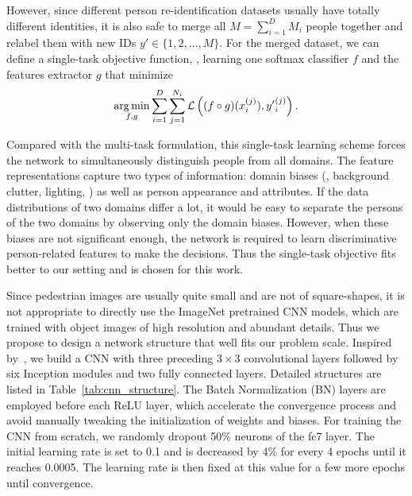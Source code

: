 However, since different person re-identification datasets usually have totally different identities, it is also safe to merge all $M=\sum_{i=1}^D M_i$ people together and relabel them with new IDs ${y'} \in \{1,2,\dots,M\}$. For the merged dataset, we can define a single-task objective function, \ie, learning one softmax classifier $f$ and the features extractor $g$ that minimize
\begin{equation} \label{eq:single-task-objfunc}
    \mathop{\mathrm{arg\,min}}_{f,g} \sum_{i=1}^D \sum_{j=1}^{N_i} \mathcal{L}\left( (f\circ g)(x_i^{(j)}), {y'}_i^{(j)} \right).
\end{equation}

Compared with the multi-task formulation, this single-task learning scheme forces the network to simultaneously distinguish people from all domains. The feature representations capture two types of information: domain biases (\eg, background clutter, lighting, \etc) as well as person appearance and attributes. If the data distributions of two domains differ a lot, it would be easy to separate the persons of the two domains by observing only the domain biases. However, when these biases are not significant enough, the network is required to learn discriminative person-related features to make the decisions. Thus the single-task objective fits better to our setting and is chosen for this work.

Since pedestrian images are usually quite small and are not of square-shapes, it is not appropriate to directly use the ImageNet pretrained CNN models, which are trained with object images of high resolution and abundant details. Thus we propose to design a network structure that well fits our problem scale. Inspired by~\cite{ioffe2015batch,simonyan2014very}, we build a CNN with three preceding $3\times 3$ convolutional layers followed by six Inception modules and two fully connected layers. Detailed structures are listed in Table~\ref{tab:cnn_structure}. The Batch Normalization (BN) layers are employed before each ReLU layer, which accelerate the convergence process and avoid manually tweaking the initialization of weights and biases. For training the CNN from scratch, we randomly dropout 50\% neurons of the fc7 layer. The initial learning rate is set to 0.1 and is decreased by 4\% for every 4 epochs until it reaches 0.0005. The learning rate is then fixed at this value for a few more epochs until convergence.


